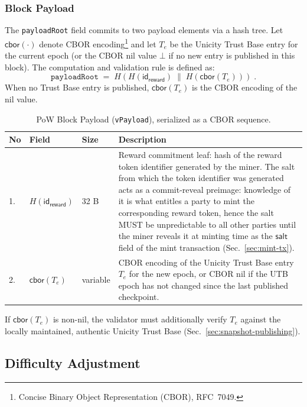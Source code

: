 \subsubsection{Block Payload}\label{sec:pow-payload}

The \texttt{payloadRoot} field commits to two payload elements via a hash tree. Let $\mathsf{cbor}(\cdot)$ denote CBOR encoding\footnote{Concise Binary Object Representation (CBOR), RFC~7049.} and let $T_e$ be the Unicity Trust Base entry for the current epoch (or the CBOR nil value $\bot$ if no new entry is published in this block). The computation and validation rule is defined as:
\[
  \texttt{payloadRoot} \;=\; H(H(\mathsf{id}_\mathsf{reward}) \;\|\; H(\mathsf{cbor}(T_e))) \;.
\]
When no Trust Base entry is published, $\mathsf{cbor}(T_e)$ is the CBOR encoding of the nil value.

\begin{table}[!htbp]
  \begin{center}
    \caption{PoW Block Payload (\texttt{vPayload}), serialized as a CBOR sequence.}\label{ta:pow-block-payload}
    \begin{tabular}{|p{0.5cm}|p{3.5cm}|p{1.5cm}|p{7.5cm}|}\hline
      No & Field & Size & Description \\\hline\hline
      1. & $H(\mathsf{id}_\mathsf{reward})$ & 32 B & Reward commitment leaf: hash of the reward token identifier generated by the miner. The salt from which the token identifier was generated acts as a commit-reveal preimage: knowledge of it is what entitles a party to mint the corresponding reward token, hence the salt MUST be unpredictable to all other parties until the miner reveals it at minting time as the $\mathsf{salt}$ field of the mint transaction (Sec.~\ref{sec:mint-tx}). \\\hline
      2. & $\mathsf{cbor}(T_e)$ & variable & CBOR encoding of the Unicity Trust Base entry $T_e$ for the new epoch, or CBOR nil if the UTB epoch has not changed since the last published checkpoint. \\\hline
    \end{tabular}
  \end{center}
\end{table}

If $\mathsf{cbor}(T_e)$ is non-nil, the validator must additionally verify $T_e$ against the locally maintained, authentic Unicity Trust Base (Sec.~\ref{sec:snapshot-publishing}).


\subsection{Difficulty Adjustment}\label{sec:pow-difficulty}

